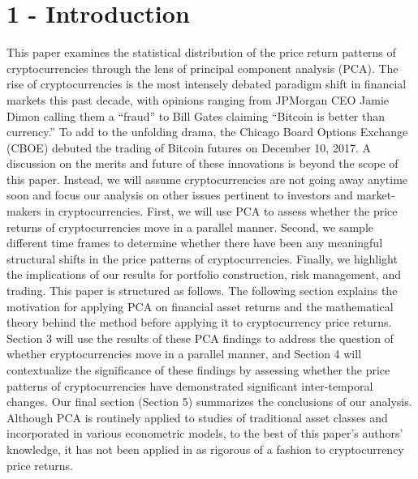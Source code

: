 \documentclass[12pt,twoside]{article}
\begin{document}

\section*{1 - Introduction}
This paper examines the statistical distribution of the price return patterns of cryptocurrencies through the lens of principal component analysis (PCA). The rise of cryptocurrencies is the most intensely debated paradigm shift in financial markets this past decade, with opinions ranging from JPMorgan CEO Jamie Dimon calling them a “fraud” to Bill Gates claiming “Bitcoin is better than currency.” To add to the unfolding drama, the Chicago Board Options Exchange (CBOE) debuted the trading of Bitcoin futures on December 10, 2017. A discussion on the merits and future of these innovations is beyond the scope of this paper.
\bigbreak
Instead, we will assume cryptocurrencies are not going away anytime soon and focus our analysis on other issues pertinent to investors and market-makers in cryptocurrencies. First, we will use PCA to assess whether the price returns of cryptocurrencies move in a parallel manner. Second, we sample different time frames to determine whether there have been any meaningful structural shifts in the price patterns of cryptocurrencies. Finally, we highlight the implications of our results for portfolio construction, risk management, and trading.
\bigbreak
This paper is structured as follows. The following section explains the motivation for applying PCA on financial asset returns and the mathematical theory behind the method before applying it to cryptocurrency price returns. Section 3 will use the results of these PCA findings to address the question of whether cryptocurrencies move in a parallel manner, and Section 4 will contextualize the significance of these findings by assessing whether the price patterns of cryptocurrencies have demonstrated significant inter-temporal changes. Our final section (Section 5) summarizes the conclusions of our analysis. Although PCA is routinely applied to studies of traditional asset classes and incorporated in various econometric models, to the best of this paper’s authors’ knowledge, it has not been applied in as rigorous of a fashion to cryptocurrency price returns.
\end{document}
